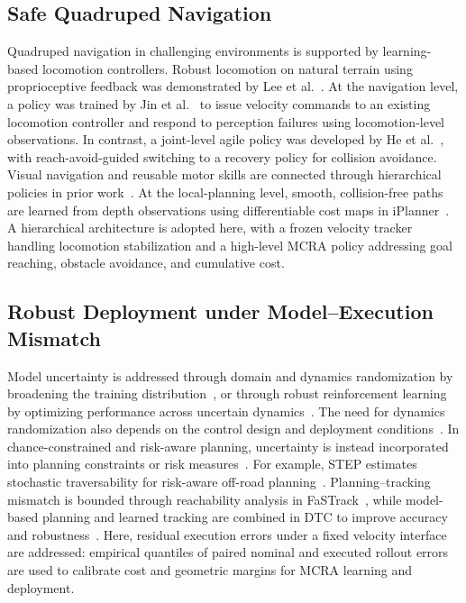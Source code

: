 \documentclass[conference]{IEEEtran}
\begin{document}
\subsection{Safe Quadruped Navigation}
Quadruped navigation in challenging environments is supported by
learning-based locomotion controllers. Robust locomotion on natural terrain
using proprioceptive feedback was demonstrated by Lee et al.~\cite{lee2020}.
At the navigation level, a policy
was trained by Jin et al.~\cite{jin2023resilient} to issue velocity commands to an
existing locomotion controller and respond to perception failures using
locomotion-level observations. In contrast, a joint-level agile policy was
developed by He et al.~\cite{he2024abs}, with reach-avoid-guided switching to a
recovery policy for collision avoidance. Visual navigation and reusable motor
skills are connected through hierarchical policies in prior
work~\cite{jain2021pixels}. At the local-planning level, smooth,
collision-free paths are learned from depth observations using differentiable
cost maps in iPlanner~\cite{yang2023iplanner}. A hierarchical architecture is
adopted here, with a frozen velocity tracker handling
locomotion stabilization and a high-level MCRA policy addressing goal reaching,
obstacle avoidance, and cumulative cost.

\subsection{Robust Deployment under Model--Execution Mismatch}
Model uncertainty is addressed through domain and dynamics randomization by
broadening the training distribution~\cite{tobin2017,tan2018simreal},
or through robust reinforcement learning by optimizing performance across uncertain
dynamics~\cite{wang2021}. The need for dynamics randomization
also depends on the control design and deployment conditions~\cite{xie2021randomization}.
In chance-constrained and risk-aware planning, uncertainty is instead incorporated
into planning constraints or risk measures~\cite{theurkauf2023,fan2021step}.
For example, STEP estimates stochastic traversability for risk-aware off-road
planning~\cite{fan2021step}.
Planning--tracking mismatch is bounded through reachability analysis in
FaSTrack~\cite{herbert2017fastrack}, while model-based planning and learned tracking
are combined in DTC to improve accuracy and robustness~\cite{jenelten2024dtc}.
Here, residual execution errors under a fixed velocity interface are addressed:
empirical quantiles of paired nominal and executed rollout errors are
used to calibrate cost and geometric margins for MCRA learning and deployment.
\end{document}

